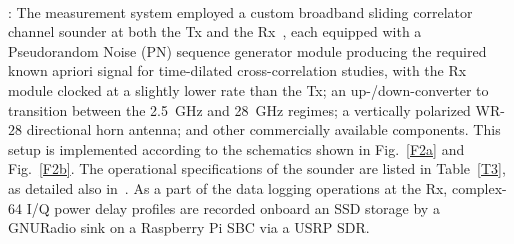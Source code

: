 \documentclass[10pt, twocolumn]{IEEEtran}
\begin{document}
\\: The measurement system employed a custom broadband sliding correlator channel sounder at both the Tx and the Rx~\cite{Purdue}, each equipped with a Pseudorandom Noise (PN) sequence generator module producing the required known apriori signal for time-dilated cross-correlation studies, with the Rx module clocked at a slightly lower rate than the Tx; an up-/down-converter to transition between the \SI{2.5}{\giga\hertz} and \SI{28}{\giga\hertz} regimes; a vertically polarized WR-$28$ directional horn antenna; and other commercially available components. This setup is implemented according to the schematics shown in Fig.~\ref{F2a} and Fig.~\ref{F2b}. The operational specifications of the sounder are listed in Table~\ref{T3}, as detailed also in~\cite{Purdue}. As a part of the data logging operations at the Rx, complex-\SI{64}{} I/Q power delay profiles are recorded onboard an SSD storage by a GNURadio sink on a Raspberry Pi SBC via a USRP SDR.\\
\end{document}
